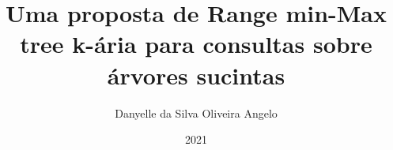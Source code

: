\documentclass[pt,twoside,onehalfspacing,bsc]{ifbclass/ifbclass}
\title{Uma proposta de Range min-Max tree k-ária para consultas sobre árvores sucintas}
\date{2021}
\author{Danyelle da Silva Oliveira Angelo}
\begin{document}
  
  \frontmatter
  
  \frontpage
  
  \presentationpage
  
  \begin{fichacatalografica}
    \FakeFichaCatalografica %
  \end{fichacatalografica}
  
  \banca
  
  
  
  
  \resumo
  {\parindent0pt
    
  }
  
  \abstract
  {\parindent0pt
    
  }
  

  \tableofcontents
  
  \mainmatter
  
 
  
  
  
  
 
  \begin{references}
    
  \end{references}
  
 
\end{document}
